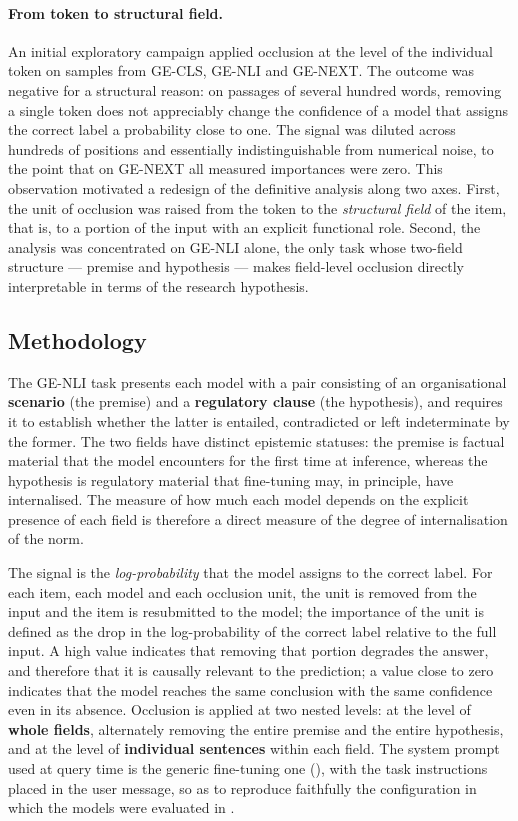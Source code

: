 \documentclass[pdflatex, sn-apa]{sn-jnl}%
\theoremstyle{thmstyleone}%
\theoremstyle{thmstyletwo}%
\theoremstyle{thmstylethree}%
\begin{document}
\paragraph{From token to structural field.}
An initial exploratory campaign applied occlusion at the level of the individual
token on samples from GE-CLS, GE-NLI and GE-NEXT. The outcome was negative for a
structural reason: on passages of several hundred words, removing a single token
does not appreciably change the confidence of a model that assigns the correct
label a probability close to one. The signal was diluted across hundreds of
positions and essentially indistinguishable from numerical noise, to the point
that on GE-NEXT all measured importances were zero. This observation motivated a
redesign of the definitive analysis along two axes. First, the unit of occlusion
was raised from the token to the \emph{structural field} of the item, that is, to
a portion of the input with an explicit functional role. Second, the analysis was
concentrated on GE-NLI alone, the only task whose two-field structure --- premise
and hypothesis --- makes field-level occlusion directly interpretable in terms of
the research hypothesis.

\subsection{Methodology}
\label{sec:xai:method}

The GE-NLI task presents each model with a pair consisting of an organisational
\textbf{scenario} (the premise) and a \textbf{regulatory clause} (the
hypothesis), and requires it to establish whether the latter is entailed,
contradicted or left indeterminate by the former. The two fields have distinct
epistemic statuses: the premise is factual material that the model encounters for
the first time at inference, whereas the hypothesis is regulatory material that
fine-tuning may, in principle, have internalised. The measure of how much each
model depends on the explicit presence of each field is therefore a direct
measure of the degree of internalisation of the norm.

The signal is the \emph{log-probability} that the model assigns to the correct
label. For each item, each model and each occlusion unit, the unit is removed
from the input and the item is resubmitted to the model; the importance of the
unit is defined as the drop in the log-probability of the correct label relative
to the full input. A high value indicates that removing that portion degrades the
answer, and therefore that it is causally relevant to the prediction; a value
close to zero indicates that the model reaches the same conclusion with the same
confidence even in its absence. Occlusion is applied at two nested levels: at the
level of \textbf{whole fields}, alternately removing the entire premise and the
entire hypothesis, and at the level of \textbf{individual sentences} within each
field. The system prompt used at query time is the generic fine-tuning one
(), with the task instructions placed in the user message, so as
to reproduce faithfully the configuration in which the models were evaluated in
.
\end{document}
